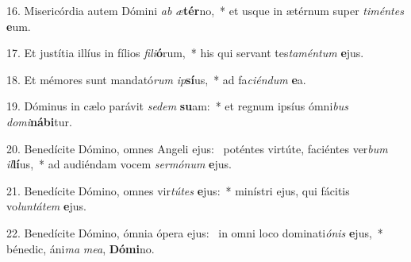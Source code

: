 16. Misericórdia autem Dómini \textit{ab} \textit{æ}\textbf{tér}no,~*  et usque in ætérnum super \textit{ti}\textit{mén}\textit{tes} \textbf{e}um.\

17. Et justítia illíus in fílios \textit{fi}\textit{li}\textbf{ó}rum,~*  his qui servant tes\textit{ta}\textit{mén}\textit{tum} \textbf{e}jus.\

18. Et mémores sunt mandató\textit{rum} \textit{ip}\textbf{sí}us,~*  ad fa\textit{ci}\textit{én}\textit{dum} \textbf{e}a.\

19. Dóminus in cælo parávit \textit{se}\textit{dem} \textbf{su}am:~*  et regnum ipsíus ómni\textit{bus} \textit{do}\textit{mi}\textbf{ná}\textbf{bi}tur.\

20. Benedícite Dómino, omnes Angeli ejus: \dag\  poténtes virtúte, faciéntes ver\textit{bum} \textit{il}\textbf{lí}us,~*  ad audiéndam vocem \textit{ser}\textit{mó}\textit{num} \textbf{e}jus.\

21. Benedícite Dómino, omnes vir\textit{tú}\textit{tes} \textbf{e}jus:~*  minístri ejus, qui fácitis vo\textit{lun}\textit{tá}\textit{tem} \textbf{e}jus.\

22. Benedícite Dómino, ómnia ópera ejus: \dag\  in omni loco dominati\textit{ó}\textit{nis} \textbf{e}jus,~*  bénedic, áni\textit{ma} \textit{me}\textit{a}, \textbf{Dó}\textbf{mi}no.\

